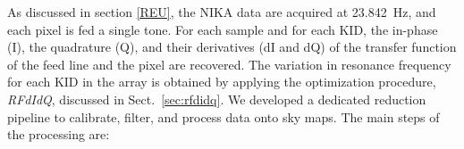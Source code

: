 
As discussed in section \ref{REU}, the NIKA data are acquired at 23.842~Hz,
and each pixel is fed a single tone. For each sample and for each KID, the in-phase (I), the
quadrature (Q), and their derivatives (dI and dQ) of the transfer function
of the feed line and the pixel are recovered.
The variation in resonance frequency for each KID in the array is obtained by applying
the optimization procedure, \emph{RFdIdQ}, discussed in Sect.~\ref{sec:rfdidq}.
We developed a dedicated
reduction pipeline to calibrate, filter, and process data onto sky maps.  
The main steps of the processing are:
